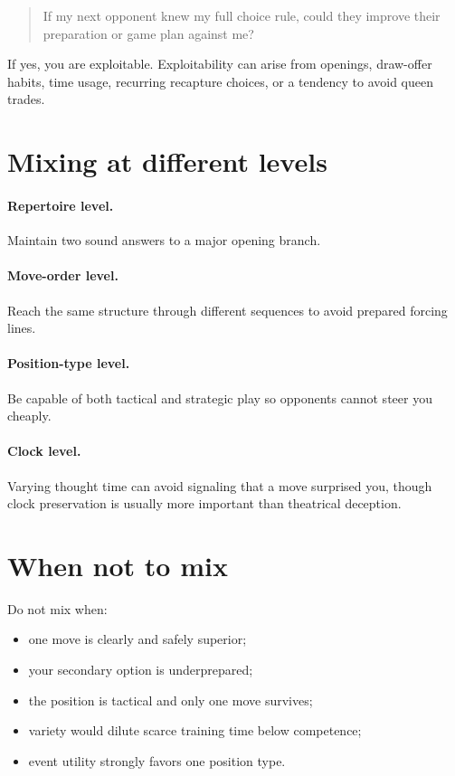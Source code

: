 \begin{quote}
If my next opponent knew my full choice rule, could they improve their preparation or game plan against me?
\end{quote}

If yes, you are exploitable. Exploitability can arise from openings, draw-offer habits, time usage, recurring recapture choices, or a tendency to avoid queen trades.

\section{Mixing at different levels}
\paragraph{Repertoire level.} Maintain two sound answers to a major opening branch.

\paragraph{Move-order level.} Reach the same structure through different sequences to avoid prepared forcing lines.

\paragraph{Position-type level.} Be capable of both tactical and strategic play so opponents cannot steer you cheaply.

\paragraph{Clock level.} Varying thought time can avoid signaling that a move surprised you, though clock preservation is usually more important than theatrical deception.

\section{When not to mix}
Do not mix when:

\begin{itemize}[leftmargin=1.4em]
\item one move is clearly and safely superior;
\item your secondary option is underprepared;
\item the position is tactical and only one move survives;
\item variety would dilute scarce training time below competence;
\item event utility strongly favors one position type.
\end{itemize}

